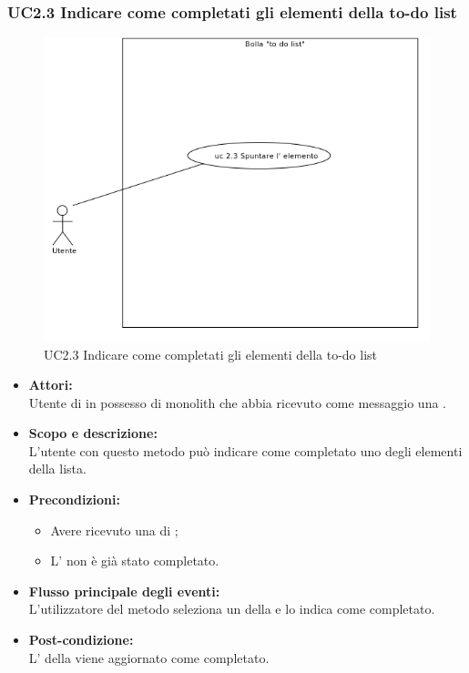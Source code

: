 \subsubsection{UC2.3 Indicare come completati gli elementi della to-do list} \label{UC2.3}

\begin{figure}[H]
	\centering
	\includegraphics[width=15cm]{../../documenti/AnalisiDeiRequisiti/Diagrammi_img/uc2_3.png}
	\caption{UC2.3 Indicare come completati gli elementi della to-do list}
\end{figure}

\begin{itemize}
	\item \textbf{Attori:}
	\\Utente di  in possesso di monolith che abbia ricevuto come messaggio una  .
	\item \textbf{Scopo e descrizione:} 
	\\L'utente con questo metodo può indicare come completato uno degli elementi della lista.
	\item \textbf{Precondizioni:}
	\begin{itemize}
		\item Avere ricevuto una  di ;
		\item L’ non è già stato completato.
	\end{itemize}
	\item \textbf{Flusso principale degli eventi:}
	\\L'utilizzatore del metodo seleziona un  della  e lo indica come completato. 
	\item \textbf{Post-condizione:}
	\\L’ della  viene aggiornato come completato.
\end{itemize}

